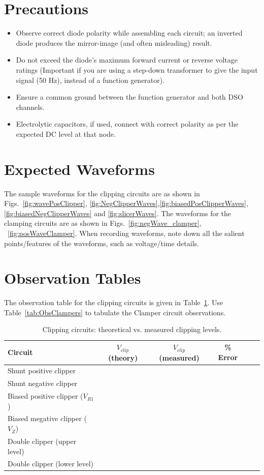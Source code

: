 \section{Precautions}
\begin{itemize}
	\item Observe correct diode polarity while assembling each circuit; an inverted diode produces the mirror-image (and often misleading) result.
	\item Do not exceed the diode's maximum forward current or reverse voltage ratings (Important if you are using a step-down transformer to give the input signal (50 Hz), instead of a function generator).
	\item Ensure a common ground between the function generator and both DSO channels.
	\item Electrolytic capacitors, if used, connect with correct polarity as per the expected DC level at that node.
\end{itemize}
\section{Expected Waveforms}
The sample waveforms for the clipping circuits are as shown in Figs.~\ref{fig:wavePosClipper}, \ref{fig:NegClipperWaves},\ref{fig:biasedPosClipperWaves}, \ref{fig:biasedNegClipperWaves} and \ref{fig:slicerWaves}. The waveforms for the clamping circuits are as shown in Figs.~\ref{fig:negWave_clamper}, ~\ref{fig:posWaveClamper}. When recording waveforms, note down all the salient points/features of the waveforms, such as voltage/time details.

\section{Observation Tables}
The observation table for the clipping circuits is given in Table~\ref{tab:ObsClippers}. Use Table~\ref{tab:ObsClampers} to tabulate the Clamper circuit observations.
\begin{table}[ht!]
	\centering
	\begin{tabular}{@{}lccccc@{}}
		\toprule
		Circuit & $V_{clip}$ (theory) & $V_{clip}$ (measured) & \% Error \\
		\midrule
		Shunt positive clipper &  &  &  \\
		Shunt negative clipper &  &  &  \\
		Biased positive clipper ($V_{R1}$) &  &  &  \\
		Biased megative clipper ($V_{Z}$) &  &  &  \\
		Double clipper (upper level) &  &  &  \\
		Double clipper (lower level) &  &  &  \\
		\bottomrule
	\end{tabular}
	\caption{Clipping circuits: theoretical vs. measured clipping levels.}
	\label{tab:ObsClippers}
\end{table}

